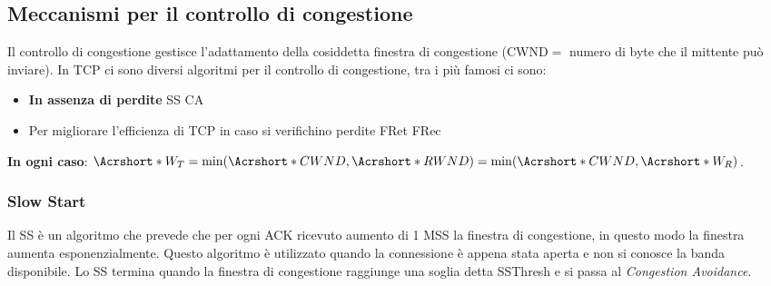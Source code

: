     \subsection{Meccanismi per il controllo di congestione}
        Il controllo di congestione gestisce l'adattamento della cosiddetta finestra di congestione (\Acrshort*{CWND}$=$ numero di byte che il mittente può inviare). \newline
        In \Acrshort*{TCP} ci sono diversi algoritmi per il controllo di congestione, tra i più famosi ci sono: \begin{itemize}
            \item \textbf{In assenza di perdite}
                \subitem \Acrlong*{SS}
                \subitem \Acrlong*{CA}
            \item Per migliorare l'efficienza di \Acrshort*{TCP} in caso si verifichino perdite
                \subitem \Acrlong*{FRet}
                \subitem \Acrlong*{FRec}
        \end{itemize}
        \textbf{In ogni caso}: $\Acrshort*{W_T} = \min(\Acrshort*{CWND}, \Acrshort*{RWND}) = \min(\Acrshort*{CWND}, \Acrshort*{W_R}) $.
        \subsubsection{Slow Start}
            Il \Acrlong*{SS} è un algoritmo che prevede che per ogni \Acrshort*{ACK} ricevuto aumento di 1 \Acrshort*{MSS} la finestra di congestione, in questo modo la finestra aumenta esponenzialmente. Questo algoritmo è utilizzato quando la connessione è appena stata aperta e non si conosce la banda disponibile. Lo \Acrlong*{SS} termina quando la finestra di congestione raggiunge una soglia detta \acrfull*{SSThresh} e si passa al \textit{Congestion Avoidance}.
